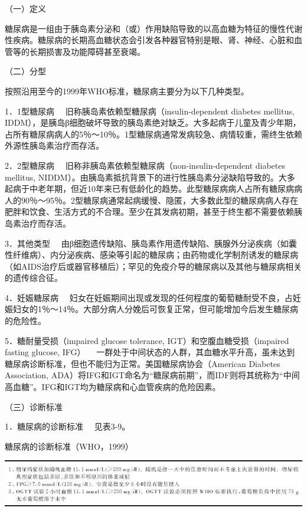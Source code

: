 （一）定义

糖尿病是一组由于胰岛素分泌和（或）作用缺陷导致的以高血糖为特征的慢性代谢性疾病。糖尿病的长期高血糖状态会引发各种器官特别是眼、肾、神经、心脏和血管等的长期损害及功能障碍甚至衰竭。

（二）分型

按照沿用至今的1999年WHO标准，糖尿病主要分为以下几种类型。

{1．1型糖尿病} 　旧称胰岛素依赖型糖尿病（insulin-dependent diabetes
mellitus,
IDDM），是胰岛β细胞破坏导致的胰岛素绝对缺乏。大多起病于儿童及青少年期，占所有糖尿病病人的5％～10％。1型糖尿病通常发病较急、病情较重，需终生依赖外源性胰岛素治疗而存活。

{2．2型糖尿病} 　旧称非胰岛素依赖型糖尿病（non-insulin-dependent
diabetes mellitus,
NIDDM）。由胰岛素抵抗背景下的进行性胰岛素分泌缺陷导致的。大多起病于中老年期，但近10年来已有低龄化的趋势。此型糖尿病病人占所有糖尿病病人的90％～95％。2型糖尿病通常起病缓慢、隐匿，大多数此型的糖尿病病人存在肥胖和饮食、生活方式的不合理。至少在其发病初期，甚至于终生都不需要依赖胰岛素治疗而存活。

{3．其他类型}
　由β细胞遗传缺陷、胰岛素作用遗传缺陷、胰腺外分泌疾病（如囊性纤维病）、内分泌疾病、感染等引起的糖尿病；由药物或化学制剂诱发的糖尿病（如AIDS治疗后或器官移植后）；罕见的免疫介导的糖尿病以及其他与糖尿病相关的遗传综合征。

{4．妊娠糖尿病}
　妇女在妊娠期间出现或发现的任何程度的葡萄糖耐受不良，占妊娠妇女的1％～14％。大部分病人分娩后可恢复正常，但可能增加今后发生糖尿病的危险性。

{5．糖耐量受损（impaired glucose tolerance,
IGT）和空腹血糖受损（impaired fasting glucose, IFG）}
　一群处于中间状态的人群，其血糖水平升高，虽未达到糖尿病诊断标准，但也不能归为正常。美国糖尿病协会（American
Diabetes Association,
ADA）将IFG和IGT命名为“糖尿病前期”，而IDF则将其统称为“中间高血糖”。IFG和IGT均为糖尿病和心血管疾病的危险因素。

（三）诊断标准

{1．糖尿病的诊断标准} 　见表3-9。

\begin{table}[htbp]
\centering
\caption{糖尿病的诊断标准（WHO，1999）}
\label{tab3-9}
\includegraphics{./images/Image00025.jpg}
\end{table}


